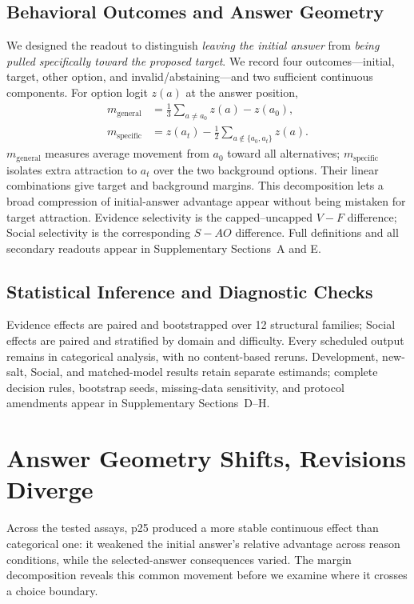 \documentclass[letterpaper]{article} %
\begin{document}
\subsection{Behavioral Outcomes and Answer Geometry}
\label{sec:cedar-readouts}

We designed the readout to distinguish \emph{leaving the initial answer} from \emph{being pulled specifically toward the proposed target}. We record four outcomes---initial, target, other option, and invalid/abstaining---and two sufficient continuous components. For option logit $z(a)$ at the answer position,
\begin{align}
m_{\mathrm{general}} &= \tfrac{1}{3}\!\sum_{a\neq a_0}z(a)-z(a_0),\nonumber\\
m_{\mathrm{specific}} &= z(a_t)-\tfrac{1}{2}\!\sum_{a\notin\{a_0,a_t\}}z(a).
\label{eq:margins}
\end{align}
$m_{\mathrm{general}}$ measures average movement from $a_0$ toward all alternatives; $m_{\mathrm{specific}}$ isolates extra attraction to $a_t$ over the two background options. Their linear combinations give target and background margins. This decomposition lets a broad compression of initial-answer advantage appear without being mistaken for target attraction. Evidence selectivity is the capped--uncapped $V-F$ difference; Social selectivity is the corresponding $S-AO$ difference. Full definitions and all secondary readouts appear in Supplementary Sections~A and E.

\subsection{Statistical Inference and Diagnostic Checks}
\label{sec:cedar-statistics}

Evidence effects are paired and bootstrapped over 12 structural families; Social effects are paired and stratified by domain and difficulty. Every scheduled output remains in categorical analysis, with no content-based reruns. Development, new-salt, Social, and matched-model results retain separate estimands; complete decision rules, bootstrap seeds, missing-data sensitivity, and protocol amendments appear in Supplementary Sections~D--H.

\section{Answer Geometry Shifts, Revisions Diverge}
\label{sec:behavior}

Across the tested assays, p25 produced a more stable continuous effect than categorical one: it weakened the initial answer's relative advantage across reason conditions, while the selected-answer consequences varied. The margin decomposition reveals this common movement before we examine where it crosses a choice boundary.
\end{document}
